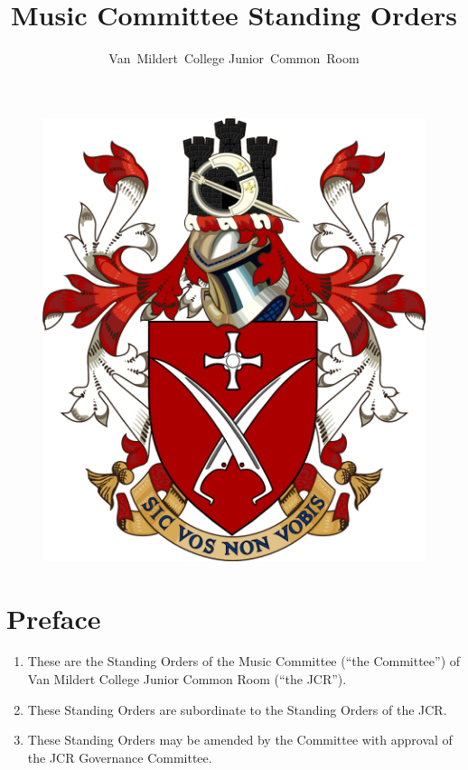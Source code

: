 \documentclass[12pt]{article}
\title{Music Committee Standing Orders}
\author{Van~Mildert~College Junior~Common~Room}
\date{\thedate}
\begin{document}
\begin{titlepage}  %
    \maketitle
    \begin{figure}[h]
        \includegraphics[scale=0.25]{arms}  %
        \centering
    \end{figure}
    \thispagestyle{empty}
\end{titlepage}

\setcounter{page}{2}  %
\section{Preface}
\begin{enumerate}
    \item These are the Standing Orders of the Music Committee (``the Committee'') of Van Mildert College Junior Common Room (``the JCR'').
    \item These Standing Orders are subordinate to the Standing Orders of the JCR.
    \item These Standing Orders may be amended by the Committee with approval of the JCR Governance Committee.
\end{enumerate}
\end{document}
